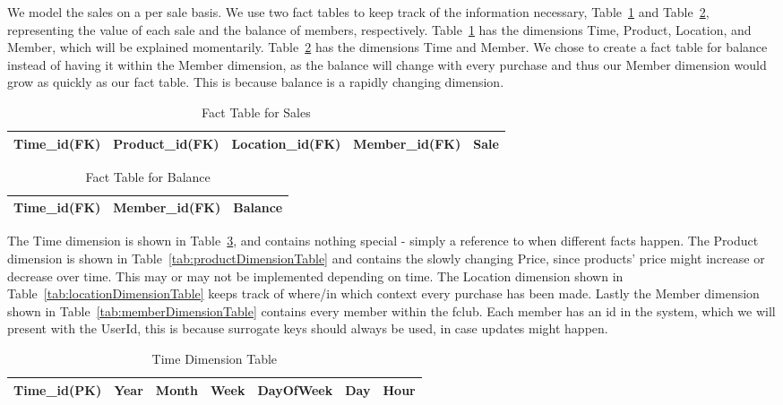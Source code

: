 We model the sales on a per sale basis. We use two fact tables to keep track of the information necessary, Table~\ref{tab:salesFactTable} and Table~\ref{tab:balanceFactTable}, representing the value of each sale and the balance of members, respectively. Table~\ref{tab:salesFactTable} has the dimensions Time, Product, Location, and Member, which will be explained momentarily. Table~\ref{tab:balanceFactTable} has the dimensions Time and Member. We chose to create a fact table for balance instead of having it within the Member dimension, as the balance will change with every purchase and thus our Member dimension would grow as quickly as our fact table. This is because balance is a rapidly changing dimension.


\begin{table}[H]
    \centering
    \begin{tabular}{|l|l|l|l|l|}
        \hline
        Time_id(FK) & Product_id(FK) & Location_id(FK) & Member_id(FK) & Sale \\ \hline
    \end{tabular}
    \caption{Fact Table for Sales}
    \label{tab:salesFactTable}
\end{table}

\begin{table}[H]
    \centering
    \begin{tabular}{|l|l|l|}
        \hline
        Time_id(FK) & Member_id(FK) & Balance \\ \hline
    \end{tabular}
    \caption{Fact Table for Balance}
    \label{tab:balanceFactTable}
\end{table}


The Time dimension is shown in Table~\ref{tab:timeDimensionTable}, and contains nothing special - simply a reference to when different facts happen. The Product dimension is shown in Table~\ref{tab:productDimensionTable} and contains the slowly changing Price, since products' price might increase or decrease over time. This may or may not be implemented depending on time. The Location dimension shown in Table~\ref{tab:locationDimensionTable} keeps track of where/in which context every purchase has been made. Lastly the Member dimension shown in Table~\ref{tab:memberDimensionTable} contains every member within the fclub. Each member has an id in the system, which we will present with the UserId, this is because surrogate keys should always be used, in case updates might happen.

\begin{table}[H]
    \centering
    \begin{tabular}{|l|l|l|l|l|l|l|}
        \hline
        Time_id(PK) & Year & Month & Week & DayOfWeek & Day & Hour \\ \hline
    \end{tabular}
    \caption{Time Dimension Table}
    \label{tab:timeDimensionTable}
\end{table}

